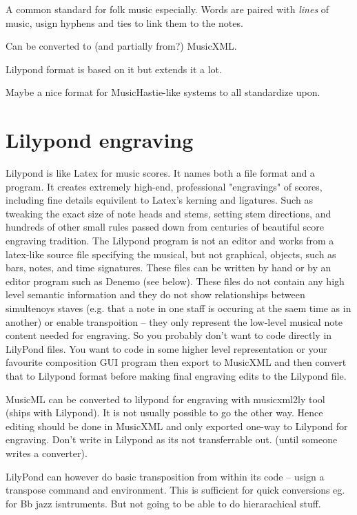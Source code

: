\documentclass[oneside,english]{scrbook}
\begin{document}
A common standard for folk music especially.   Words are paired with {\em lines} of music, usign hyphens and ties to link them to the notes.

Can be converted to (and partially from?) MusicXML.

Lilypond format is based on it but extends it a lot.

Maybe a nice format for MusicHastie-like systems to all standardize upon.


\section{Lilypond engraving}

Lilypond is like Latex for music scores.  It names both a file format and a program.  It creates extremely high-end, professional "engravings" of scores, including fine details equivilent to Latex's kerning and ligatures. Such as tweaking the exact size of note heads and stems, setting stem directions, and hundreds of other small rules passed down from centuries of beautiful score engraving tradition.   The Lilypond program is not an editor and works from a latex-like source file specifying the musical, but not graphical, objects, such as bars, notes, and time signatures. These files can be written by hand or by an editor program such as Denemo (see below). These files do not contain any high level semantic information and they do not show relationships between simultenoys staves (e.g. that a note in one staff is occuring at the saem time as in another) or enable transpoition -- they only represent the low-level musical note content needed for engraving. So you probably don't want to code directly in LilyPond files. You want to code in some higher level representation or your favourite composition GUI program then export to MusicXML and then convert that to Lilypond format before making final engraving edits to the Lilypond file.  

MusicML can be converted to lilypond for engraving with musicxml2ly tool (ships with Lilypond). It is not usually possible to go the other way. Hence editing should be done in MusicXML and only exported one-way to Lilypond for engraving.  Don't write in Lilypond as its not transferrable out. (until someone writes a converter).

LilyPond can however do basic transposition from within its code -- usign a transpose command and environment. This is sufficient for quick conversions eg. for Bb jazz isntruments. But not going to be able to do hierarachical stuff.
\end{document}
